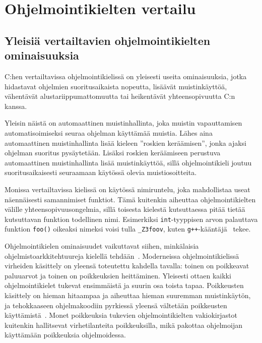 \section{Ohjelmointikielten vertailu}
\label{sec:muut}

\subsection{Yleisiä vertailtavien ohjelmointikielten ominaisuuksia}
\label{sec:muut:common}

C:hen vertailtavissa ohjelmointikielissä on yleisesti useita ominaisuuksia,
jotka hidastavat ohjelmien suoritusaikaista nopeutta, lisäävät muistinkäyttöä,
vähentävät alustariippumattomuutta tai heikentävät yhteensopivuutta C:n kanssa.

Yleisin näistä on automaattinen muistinhallinta, joka muistin vapauttamisen
automatisoimiseksi seuraa ohjelman käyttämää muistia. Lähes aina automaattinen
muistinhallinta lisää kieleen ''roskien keräämisen'', jonka ajaksi ohjelman suoritus pysäytetään. Lisäksi roskien
keräämiseen perustuva automaattinen muistinhallinta lisää muistinkäyttöä, sillä
ohjelmointikieli joutuu suoritusaikaisesti seuraamaan käytössä olevia
muistiosoitteita.

Monissa vertailtavissa kielissä on käytössä nimiruntelu,
joka mahdollistaa useat näennäisesti samannimiset funktiot. Tämä kuitenkin
aiheuttaa ohjelmointikielten välille yhteensopivuusongelmia, sillä toisesta
kielestä kutsuttaessa pitää tietää kutsuttavan funktion todellinen nimi.
Esimerkiksi \texttt{int}-tyyppisen arvon palauttava funktion \texttt{foo()}
oikeaksi nimeksi voisi tulla \texttt{\_Z3foov}, kuten
\texttt{g++}-kääntäjä~\citep{gcc} tekee.

Ohjelmointikielen ominaisuudet vaikuttavat siihen, minkälaisia
ohjelmistoarkkitehtuureja kielellä tehdään~\citep{designpatternsdesign}.
Moderneissa ohjelmointikielissä virheiden käsittely on yleensä toteutettu
kahdella tavalla: toinen on poikkeavat paluuarvot ja toinen on poikkeuksien
heittäminen. Yleisesti ottaen kaikki ohjelmointikielet tukevat ensimmäistä ja
suurin osa toista tapaa. Poikkeusten käsittely on hieman hitaampaa ja aiheuttaa
hieman suuremman muistinkäytön, ja tehokkaaseen ohjelmakoodiin pyrkiessä
yleensä vältetään poikkeusten käyttämistä~\citep{exceptioncosts}. Monet
poikkeuksia tukevien ohjelmointikielten vakiokirjastot kuitenkin hallitsevat
virhetilanteita poikkeuksilla, mikä pakottaa ohjelmoijan käyttämään poikkeuksia
ohjelmoidessa.


